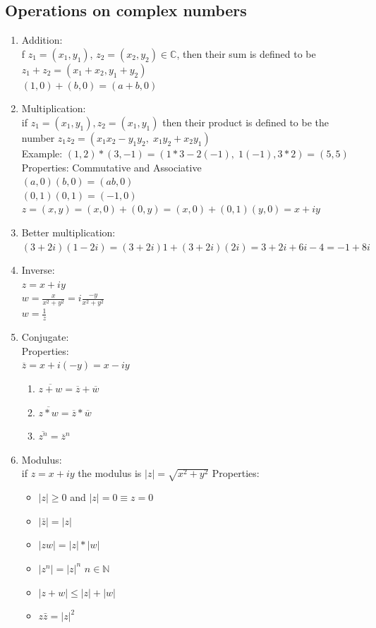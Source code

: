 \documentclass{report}
\begin{document}
\subsection{Operations on complex numbers}
\begin{enumerate}
	\item Addition:\\ f $z_1 = (x_1, y_1)$, $z_2 = (x_2, y_2) \in \mathbb{C}$, then their sum is defined to be $z_1 + z_2 = (x_1 + x_2, y_1 + y_2)$ \\
	$(1, 0)+(b, 0) = (a+b, 0)$
	\item Multiplication:\\ if $z_1 = (x_1, y_1), z_2 = (x_1, y_1)$ then their product is defined to be the number $z_1z_2=(x_1x_2 - y_1y_2,\; x_1y_2 + x_2y_1)$ \\
	Example: $(1,2)*(3, -1) = (1*3 - 2(-1), \; 1(-1), 3*2) = (5, 5)$ \\
	Properties: Commutative and Associative \\
	$(a, 0)(b, 0) = (ab, 0)$ \\
	$(0, 1)(0, 1) = (-1, 0)$\ \\
	$z = (x,y) = (x, 0) + (0, y) = (x, 0) + (0, 1)(y, 0) = x+iy$
	\item Better multiplication: \\
	$(3 + 2i)(1 - 2i) = (3+2i)1 + (3+2i)(2i) = 3+2i+6i-4=-1 + 8i$
	\item Inverse: \\
	$z = x+ iy$ \\
	$w = \frac{x}{x^2 + y^2} = i\frac{-y}{x^2 + y^2}$ \\ 
	$w = \frac{1}{z}$ 	
	\item Conjugate: \\
	Properties: \\
	$\overline{z} = x+i(-y) = x-iy$
	\begin{enumerate}
		\item $\overline{z+w} = \overline{z} + \overline{w}$
		\item $\overline{z*w} = \overline{z} * \overline{w}$
		\item $\overline{z^n} = \overline{z}^n$
	\end{enumerate}
	\pagebreak
	\item Modulus: \\
	if $z=x+iy$ the modulus is $|z|=\sqrt{x^2 + y^2}$
	Properties: \\
	\begin{itemize}
		\item $|z| \geq 0$ and $|z|=0 \equiv z=0$
		\item $|\bar{z}| = |z|$
		\item $|zw| = |z|*|w|$
		\item $|z^n| = |z|^n$   $n\in\mathbb{N}$
		\item $|z+w| \leq |z| + |w|$
		\item $z\bar{z} = |z|^2$
	\end{itemize}
\end{enumerate}
\end{document}
